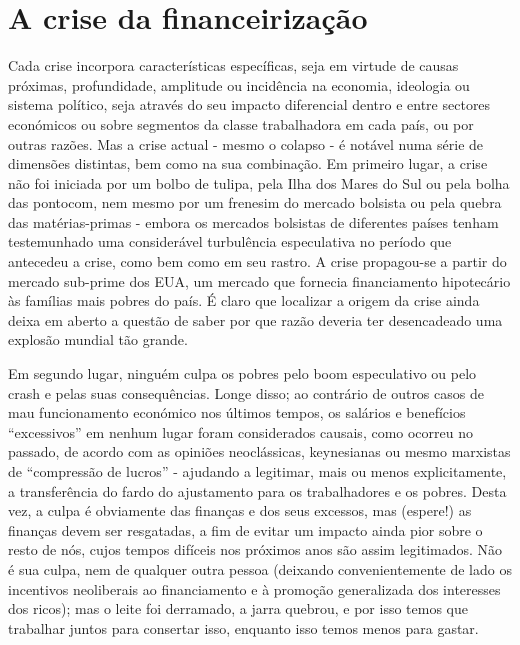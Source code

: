 \section{A crise da financeirização}
 \par 
Cada crise incorpora características específicas, seja em virtude de causas próximas, profundidade, amplitude ou incidência na economia, ideologia ou sistema político, seja através do seu impacto diferencial dentro e entre sectores económicos ou sobre segmentos da classe trabalhadora em cada país, ou por outras razões. Mas a crise actual - mesmo o colapso - é notável numa série de dimensões distintas, bem como na sua combinação. Em primeiro lugar, a crise não foi iniciada por um bolbo de tulipa, pela Ilha dos Mares do Sul ou pela bolha das pontocom, nem mesmo por um frenesim do mercado bolsista ou pela quebra das matérias-primas - embora os mercados bolsistas de diferentes países tenham testemunhado uma considerável turbulência especulativa no período que antecedeu a crise, como bem como em seu rastro. A crise propagou-se a partir do mercado sub-prime dos EUA, um mercado que fornecia financiamento hipotecário às famílias mais pobres do país. É claro que localizar a origem da crise ainda deixa em aberto a questão de saber por que razão deveria ter desencadeado uma explosão mundial tão grande.
 \par 
Em segundo lugar, ninguém culpa os pobres pelo boom especulativo ou pelo crash e pelas suas consequências. Longe disso; ao contrário de outros casos de mau funcionamento económico nos últimos tempos, os salários e benefícios “excessivos” em nenhum lugar foram considerados causais, como ocorreu no passado, de acordo com as opiniões neoclássicas, keynesianas ou mesmo marxistas de “compressão de lucros” - ajudando a legitimar, mais ou menos explicitamente, a transferência do fardo do ajustamento para os trabalhadores e os pobres. Desta vez, a culpa é obviamente das finanças e dos seus excessos, mas (espere!) as finanças devem ser resgatadas, a fim de evitar um impacto ainda pior sobre o resto de nós, cujos tempos difíceis nos próximos anos são assim legitimados. Não é sua culpa, nem de qualquer outra pessoa (deixando convenientemente de lado os incentivos neoliberais ao financiamento e à promoção generalizada dos interesses dos ricos); mas o leite foi derramado, a jarra quebrou, e por isso temos que trabalhar juntos para consertar isso, enquanto isso temos menos para gastar.
 \par 
